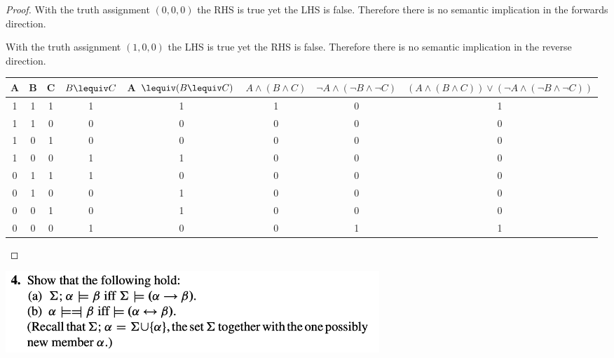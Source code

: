 \begin{proof}
  With the truth assignment $(0, 0, 0)$ the RHS is true yet the LHS is false. Therefore there is no semantic
  implication in the forwards direction.

  With the truth assignment $(1, 0, 0)$ the LHS is true yet the RHS is false. Therefore there is no semantic
  implication in the reverse direction.

  \begin{table}[h!]
    \centering
    \begin{tabular}{|c|c|c|c|c|c|c|c|}
      A & B & C
      & $B \lequiv C$
      & A $\lequiv (B \lequiv C)$
      & $A \land (B \land C)$
      & $\lnot A \land (\lnot B \land \lnot C)$
      & $(A \land (B \land C)) \lor (\lnot A \land (\lnot B \land \lnot C))$\\
      \hline
      1 & 1 & 1 & 1&      1               &          1          &              0                 &  1    \\
      1 & 1 & 0 & 0&      0               &          0          &              0                 &  0    \\
      1 & 0 & 1 & 0&      0               &          0          &              0                 &  0    \\
      1 & 0 & 0 & 1&      1               &          0          &              0                 &  0    \\
      0 & 1 & 1 & 1&      0               &          0          &              0                 &  0   \\
      0 & 1 & 0 & 0&      1               &          0          &              0                 &  0    \\
      0 & 0 & 1 & 0&      1               &          0          &              0                 &  0    \\
      0 & 0 & 0 & 1&      0               &          0          &              1                 &  1    \\
    \end{tabular}
  \end{table}

\end{proof}



\includegraphics[width=400pt]{img/logic--berkeley-125a--homework-1-346f.png}



